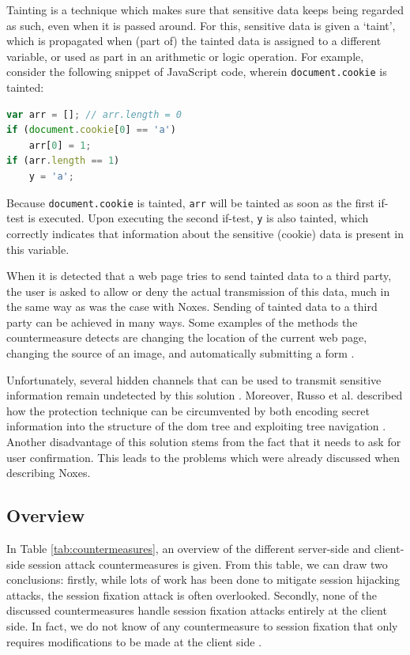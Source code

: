 Tainting is a technique which makes sure that sensitive data keeps being regarded as such, even when it is passed around. For this, sensitive data is given a `taint', which is propagated when (part of) the tainted data is assigned to a different variable, or used as part in an arithmetic or logic operation. For example, consider the following snippet of JavaScript code, wherein \texttt{document.cookie} is tainted:
\begin{lstlisting}[language=JavaScript]
var arr = []; // arr.length = 0
if (document.cookie[0] == 'a')
    arr[0] = 1;
if (arr.length == 1)
    y = 'a';
\end{lstlisting}
Because \texttt{document.cookie} is tainted, \texttt{arr} will be tainted as soon as the first if-test is executed. Upon executing the second if-test, \texttt{y} is also tainted, which correctly indicates that information about the sensitive (cookie) data is present in this variable.

When it is detected that a web page tries to send tainted data to a third party, the user is asked to allow or deny the actual transmission of this data, much in the same way as was the case with Noxes. Sending of tainted data to a third party can be achieved in many ways. Some examples of the methods the countermeasure detects are changing the location of the current web page, changing the source of an image, and automatically submitting a form \cite{Vogt2007}.

Unfortunately, several hidden channels that can be used to transmit sensitive information remain undetected by this solution \cite{Nikiforakis2010}. Moreover, Russo et al. described how the protection technique can be circumvented by both encoding secret information into the structure of the \gls{dom} tree and exploiting tree navigation \cite{Russo2009}. Another disadvantage of this solution stems from the fact that it needs to ask for user confirmation. This leads to the problems which were already discussed when describing Noxes.\\

\subsection{Overview}

In Table \ref{tab:countermeasures}, an overview of the different server-side and client-side session attack countermeasures is given. From this table, we can draw two conclusions: firstly, while lots of work has been done to mitigate session hijacking attacks, the session fixation attack is often overlooked. Secondly, none of the discussed countermeasures handle session fixation attacks entirely at the client side. In fact, we do not know of any countermeasure to session fixation that only requires modifications to be made at the client side \cite{Bonne2011}.

